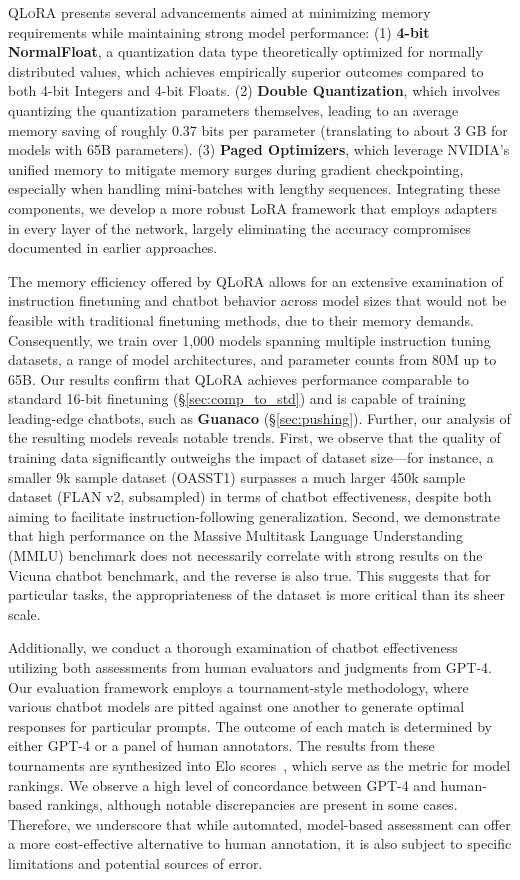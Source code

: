 \textsc{QLoRA} presents several advancements aimed at minimizing memory requirements while maintaining strong model performance: (1) \textbf{4-bit NormalFloat}, a quantization data type theoretically optimized for normally distributed values, which achieves empirically superior outcomes compared to both 4-bit Integers and 4-bit Floats. (2) \textbf{Double Quantization}, which involves quantizing the quantization parameters themselves, leading to an average memory saving of roughly 0.37 bits per parameter (translating to about 3 GB for models with 65B parameters). (3) \textbf{Paged Optimizers}, which leverage NVIDIA's unified memory to mitigate memory surges during gradient checkpointing, especially when handling mini-batches with lengthy sequences. Integrating these components, we develop a more robust LoRA framework that employs adapters in every layer of the network, largely eliminating the accuracy compromises documented in earlier approaches.

The memory efficiency offered by \textsc{QLoRA} allows for an extensive examination of instruction finetuning and chatbot behavior across model sizes that would not be feasible with traditional finetuning methods, due to their memory demands. Consequently, we train over 1,000 models spanning multiple instruction tuning datasets, a range of model architectures, and parameter counts from 80M up to 65B. Our results confirm that \textsc{QLoRA} achieves performance comparable to standard 16-bit finetuning (\S\ref{sec:comp_to_std}) and is capable of training leading-edge chatbots, such as \textbf{Guanaco} (\S\ref{sec:pushing}). Further, our analysis of the resulting models reveals notable trends. First, we observe that the quality of training data significantly outweighs the impact of dataset size—for instance, a smaller 9k sample dataset (OASST1) surpasses a much larger 450k sample dataset (FLAN v2, subsampled) in terms of chatbot effectiveness, despite both aiming to facilitate instruction-following generalization. Second, we demonstrate that high performance on the Massive Multitask Language Understanding (MMLU) benchmark does not necessarily correlate with strong results on the Vicuna chatbot benchmark, and the reverse is also true. This suggests that for particular tasks, the appropriateness of the dataset is more critical than its sheer scale.

Additionally, we conduct a thorough examination of chatbot effectiveness utilizing both assessments from human evaluators and judgments from GPT-4. Our evaluation framework employs a tournament-style methodology, where various chatbot models are pitted against one another to generate optimal responses for particular prompts. The outcome of each match is determined by either GPT-4 or a panel of human annotators. The results from these tournaments are synthesized into Elo scores~\citep{elo1967proposed, elo1978rating}, which serve as the metric for model rankings. We observe a high level of concordance between GPT-4 and human-based rankings, although notable discrepancies are present in some cases. Therefore, we underscore that while automated, model-based assessment can offer a more cost-effective alternative to human annotation, it is also subject to specific limitations and potential sources of error.

